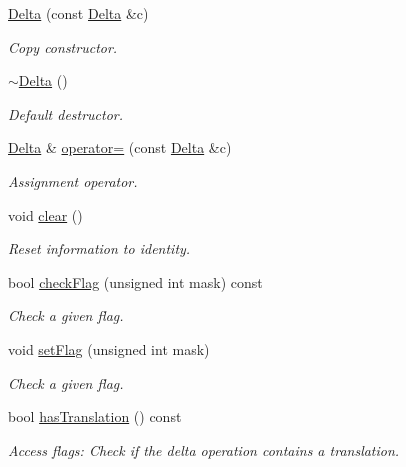 \begin{DoxyCompactItemize}
\hyperlink{class_d_d4hep_1_1_alignments_1_1_delta_a3fcd404a6a78a214f1c655a07d3db46d}{Delta} (const \hyperlink{class_d_d4hep_1_1_alignments_1_1_delta}{Delta} \&c)
\begin{DoxyCompactList}\small\item\em Copy constructor. \end{DoxyCompactList}\item 
\hyperlink{class_d_d4hep_1_1_alignments_1_1_delta_a7eff633a0f57a904c8a125178e9ba3b8}{$\sim$\+Delta} ()
\begin{DoxyCompactList}\small\item\em Default destructor. \end{DoxyCompactList}\item 
\hyperlink{class_d_d4hep_1_1_alignments_1_1_delta}{Delta} \& \hyperlink{class_d_d4hep_1_1_alignments_1_1_delta_afb22b2e26ceb2bb74b5fae0f2415abdd}{operator=} (const \hyperlink{class_d_d4hep_1_1_alignments_1_1_delta}{Delta} \&c)
\begin{DoxyCompactList}\small\item\em Assignment operator. \end{DoxyCompactList}\item 
void \hyperlink{class_d_d4hep_1_1_alignments_1_1_delta_a7262de6cf3b79dea8fd3b7ff86e10e10}{clear} ()
\begin{DoxyCompactList}\small\item\em Reset information to identity. \end{DoxyCompactList}\item 
bool \hyperlink{class_d_d4hep_1_1_alignments_1_1_delta_a072418131860ab71ee90dda0b3fe1424}{check\+Flag} (unsigned int mask) const
\begin{DoxyCompactList}\small\item\em Check a given flag. \end{DoxyCompactList}\item 
void \hyperlink{class_d_d4hep_1_1_alignments_1_1_delta_a395852746451e6e2de16e829161a5ac3}{set\+Flag} (unsigned int mask)
\begin{DoxyCompactList}\small\item\em Check a given flag. \end{DoxyCompactList}\item 
bool \hyperlink{class_d_d4hep_1_1_alignments_1_1_delta_a6b8ab86900ceb426756f12f6a3954808}{has\+Translation} () const
\begin{DoxyCompactList}\small\item\em Access flags\+: Check if the delta operation contains a translation. \end{DoxyCompactList}\item 

\end{DoxyCompactItemize}
